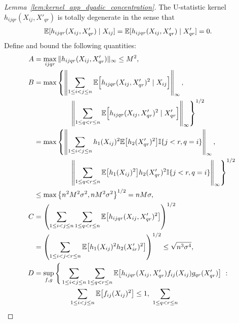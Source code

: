 \begin{proof}[Lemma~\ref{lem:kernel_app_dyadic_concentration}]
  The U-statistic kernel $h_{i j q r}(X_{i j}, X'_{qr})$
  is totally degenerate in the sense that
  \begin{align*}
    \mathbb{E}[h_{i j q r}(X_{i j}, X'_{qr}) \mid X_{i j}]
    &=
    \mathbb{E}[h_{i j q r}(X_{i j}, X'_{qr}) \mid X'_{qr}]
    = 0.
  \end{align*}
  Define and bound the following quantities:
  \begingroup
  \allowdisplaybreaks
  \begin{align*}
    A
    &=
    \max_{i j q r}
    \|h_{i j q r}(X_{i j}, X'_{qr})\|_\infty
    \leq M^2, \\
    B
    &=
    \max
    \left\{
      \left\|
      \sum_{1 \leq i < j \leq n}
      \E\Big[
        h_{i j q r}(X_{i j}, X'_{qr})^2
        \mid X_{i j}
      \Big]
      \right\|_\infty,
      \right. \\
      &\left.
      \qquad\qquad\quad
      \left\|
      \sum_{1 \leq q < r \leq n}
      \E\Big[
        h_{i j q r}(X_{i j}, X'_{qr})^2
        \mid X'_{qr}
      \Big]
      \right\|_\infty
    \right\}^{1/2} \\
    &=
    \max
    \left\{
      \left\|
      \sum_{1 \leq i < j \leq n}
      h_1(X_{i j})^2
      \E\big[
        h_2(X_{qr}')^2
      \big]
      \I\{j<r, q=i\}
      \right\|_\infty,
      \right. \\
      &\left.
      \qquad\qquad\quad
      \left\|
      \sum_{1 \leq q < r \leq n}
      \E\big[
        h_1(X_{i j})^2
      \big]
      h_2(X_{qr}')^2
      \I\{j<r, q=i\}
      \right\|_\infty
    \right\}^{1/2} \\
    &\leq
    \max
    \left\{
      n^2 M^2 \sigma^2,
      n M^2 \sigma^2
    \right\}^{1/2}
    =
    n M \sigma, \\
    C
    &=
    \left(
      \sum_{1 \leq i < j \leq n}
      \sum_{1 \leq q < r \leq n}
      \E\big[
        h_{i j q r}(X_{i j}, X'_{qr})^2
      \big]
    \right)^{1/2} \\
    &=
    \left(
      \sum_{1 \leq i < j < r \leq n}
      \E\big[
        h_1(X_{i j})^2
        h_2(X_{i r}')^2
      \big]
    \right)^{1/2}
    \leq
    \sqrt{n^3 \sigma^4}, \\
    D
    &=
    \sup_{f,g} \Bigg\{
      \sum_{1 \leq i < j \leq n}
      \sum_{1 \leq q < r \leq n}
      \E\big[
        h_{i j q r}(X_{i j}, X'_{qr})
        f_{i j}(X_{i j})
        g_{qr}(X'_{qr})
      \big]
      \ : \\
      &\qquad\qquad\quad
      \sum_{1 \leq i < j \leq n}
      \E\big[f_{i j}(X_{i j})^2\big]
      \leq 1, \
      \sum_{1 \leq q < r \leq n}

\end{align*}
\end{proof}
